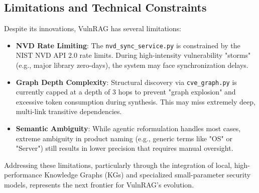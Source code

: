 \subsection{Limitations and Technical Constraints}
Despite its innovations, VulnRAG has several limitations:
\begin{itemize}
    \item \textbf{NVD Rate Limiting}: The \texttt{nvd\_sync\_service.py} is constrained by the NIST NVD API 2.0 rate limits. During high-intensity vulnerability "storms" (e.g., major library zero-days), the system may face synchronization delays.
    \item \textbf{Graph Depth Complexity}: Structural discovery via \texttt{cve\_graph.py} is currently capped at a depth of 3 hops to prevent "graph explosion" and excessive token consumption during synthesis. This may miss extremely deep, multi-link transitive dependencies.
    \item \textbf{Semantic Ambiguity}: While agentic reformulation handles most cases, extreme ambiguity in product naming (e.g., generic terms like "OS" or "Server") still results in lower precision that requires manual oversight.
\end{itemize}

Addressing these limitations, particularly through the integration of local, high-performance Knowledge Graphs (KGs) and specialized small-parameter security models, represents the next frontier for VulnRAG’s evolution.
